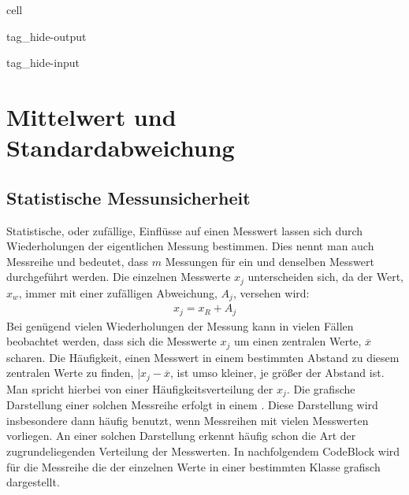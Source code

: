 \documentclass[letterpaper,10pt,english]{jupyterBook}
\begin{document}
\sphinxstepscope

\begin{sphinxuseclass}{cell}
\begin{sphinxuseclass}{tag_hide-output}
\begin{sphinxuseclass}{tag_hide-input}
\end{sphinxuseclass}
\end{sphinxuseclass}
\end{sphinxuseclass}

\section{Mittelwert und Standardabweichung}
\label{\detokenize{content/1_Mittelwert_StdAbw:mittelwert-und-standardabweichung}}\label{\detokenize{content/1_Mittelwert_StdAbw::doc}}

\subsection{Statistische Messunsicherheit}
\label{\detokenize{content/1_Mittelwert_StdAbw:statistische-messunsicherheit}}
\sphinxAtStartPar
Statistische, oder zufällige, Einflüsse auf einen Messwert lassen sich durch Wiederholungen der eigentlichen Messung bestimmen. Dies nennt man auch Messreihe und bedeutet, dass \(m\) Messungen für ein und denselben Messwert durchgeführt werden. Die einzelnen Messwerte \(x_j\) unterscheiden sich, da der  Wert, \(x_w\), immer mit einer zufälligen Abweichung, \(A_j\),  versehen wird:
\begin{equation*}
\begin{split}x_j = x_R + A_j\end{split}
\end{equation*}
\sphinxAtStartPar
Bei genügend vielen Wiederholungen der Messung kann in vielen Fällen beobachtet werden, dass sich die Messwerte \(x_j\) um einen zentralen Werte, \(\overline x\) scharen. Die Häufigkeit, einen Messwert in einem bestimmten Abstand zu diesem zentralen Werte zu finden, \(|x_j - \overline x\), ist umso kleiner, je größer der Abstand ist. Man spricht hierbei von einer Häufigkeitsverteilung der \(x_j\). Die grafische Darstellung einer solchen Messreihe erfolgt in einem . Diese Darstellung wird insbesondere dann häufig benutzt, wenn Messreihen mit vielen Messwerten vorliegen. An einer solchen Darstellung erkennt häufig schon die Art der zugrundeliegenden Verteilung der Messwerten. In nachfolgendem Code\sphinxhyphen{}Block wird für die Messreihe die  der einzelnen Werte in einer bestimmten Klasse grafisch dargestellt.
\end{document}
